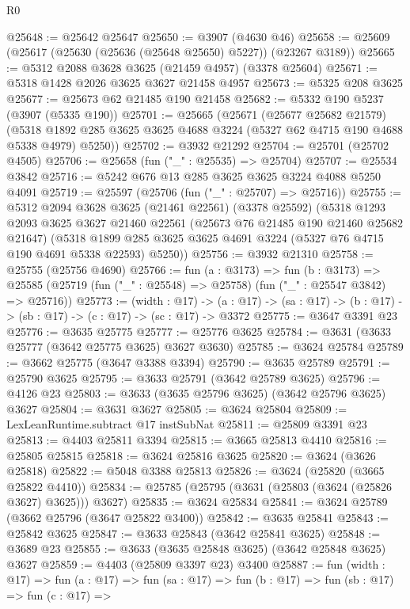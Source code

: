 \begin{lexlean}{R0}
\begin{coremodule}
@25648 := @25642 @25647
@25650 := @3907 (@4630 @46)
@25658 := @25609 (@25617 (@25630 (@25636 (@25648 @25650) @5227)) (@23267 @3189))
@25665 := @5312 @2088 @3628 @3625 (@21459 @4957) (@3378 @25604)
@25671 := @5318 @1428 @2026 @3625 @3627 @21458 @4957
@25673 := @5325 @208 @3625
@25677 := @25673 @62 @21485 @190 @21458
@25682 := @5332 @190 @5237 (@3907 (@5335 @190))
@25701 := @25665
    (@25671
      (@25677 @25682 @21579)
      (@5318 @1892 @285 @3625 @3625 @4688 @3224 (@5327 @62 @4715 @190 @4688 @5338 @4979) @5250))
@25702 := @3932 @21292
@25704 := @25701 (@25702 @4505)
@25706 := @25658 (fun ("_" : @25535) => @25704)
@25707 := @25534 @3842
@25716 := @5242 @676 @13 @285 @3625 @3625 @3224 @4088 @5250 @4091
@25719 := @25597 (@25706 (fun ("_" : @25707) => @25716))
@25755 := @5312
    @2094
    @3628
    @3625
    (@21461 @22561)
    (@3378 @25592)
    (@5318
      @1293
      @2093
      @3625
      @3627
      @21460
      @22561
      (@25673 @76 @21485 @190 @21460 @25682 @21647)
      (@5318 @1899 @285 @3625 @3625 @4691 @3224 (@5327 @76 @4715 @190 @4691 @5338 @22593) @5250))
@25756 := @3932 @21310
@25758 := @25755 (@25756 @4690)
@25766 := fun (a : @3173) =>
  fun (b : @3173) =>
  @25585 (@25719 (fun ("_" : @25548) => @25758) (fun ("_" : @25547 @3842) => @25716))
@25773 := (width : @17) ->
  (a : @17) -> (sa : @17) -> (b : @17) -> (sb : @17) -> (c : @17) -> (sc : @17) -> @3372
@25775 := @3647 @3391 @23
@25776 := @3635 @25775
@25777 := @25776 @3625
@25784 := @3631 (@3633 @25777 (@3642 @25775 @3625) @3627 @3630)
@25785 := @3624 @25784
@25789 := @3662 @25775 (@3647 @3388 @3394)
@25790 := @3635 @25789
@25791 := @25790 @3625
@25795 := @3633 @25791 (@3642 @25789 @3625)
@25796 := @4126 @23
@25803 := @3633 (@3635 @25796 @3625) (@3642 @25796 @3625) @3627
@25804 := @3631 @3627
@25805 := @3624 @25804
@25809 := LexLeanRuntime.subtract @17 instSubNat
@25811 := @25809 @3391 @23
@25813 := @4403 @25811 @3394
@25815 := @3665 @25813 @4410
@25816 := @25805 @25815
@25818 := @3624 @25816 @3625
@25820 := @3624 (@3626 @25818)
@25822 := @5048 @3388 @25813
@25826 := @3624 (@25820 (@3665 @25822 @4410))
@25834 := @25785 (@25795 (@3631 (@25803 (@3624 (@25826 @3627) @3625))) @3627)
@25835 := @3624 @25834
@25841 := @3624 @25789 (@3662 @25796 (@3647 @25822 @3400))
@25842 := @3635 @25841
@25843 := @25842 @3625
@25847 := @3633 @25843 (@3642 @25841 @3625)
@25848 := @3689 @23
@25855 := @3633 (@3635 @25848 @3625) (@3642 @25848 @3625) @3627
@25859 := @4403 (@25809 @3397 @23) @3400
@25887 := fun (width : @17) =>
  fun (a : @17) =>
  fun (sa : @17) =>
  fun (b : @17) =>
  fun (sb : @17) =>
  fun (c : @17) =>

\end{coremodule}
\end{lexlean}
